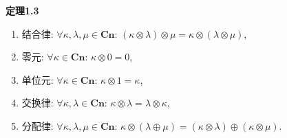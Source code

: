 \documentclass[UTF8]{ctexart}
\begin{document}
\vspace{10pt}

\hypertarget{sec:定理1.3}{}
\noindent\textbf{定理1.3}

\begin{enumerate}
    \item 结合律: $\forall\kappa,\lambda,\mu\in\mathbf{Cn}:\,
    (\kappa\otimes\lambda)\otimes\mu=\kappa\otimes(\lambda\otimes\mu)$,
    \item 零元: $\forall\kappa\in\mathbf{Cn}:\,\kappa\otimes 0=0$,
    \item 单位元: $\forall\kappa\in\mathbf{Cn}:\,\kappa\otimes 1=\kappa$,
    \item 交换律: $\forall\kappa,\lambda\in\mathbf{Cn}:\,
    \kappa\otimes\lambda=\lambda\otimes\kappa$,
    \item 分配律: $\forall\kappa,\lambda,\mu\in\mathbf{Cn}:\,
    \kappa\otimes(\lambda\oplus\mu)=(\kappa\otimes\lambda)\oplus(\kappa\otimes\mu)$.
\end{enumerate}
\end{document}
